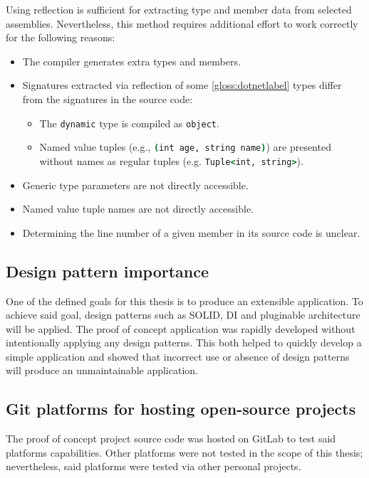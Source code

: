 Using reflection is sufficient for extracting type and member data from selected assemblies. Nevertheless, this method requires additional effort to work correctly for the following reasons:
\begin{itemize}
    \item The compiler generates extra types and members.
    \item Signatures extracted via reflection of some \ref{gloss:dotnetlabel} types differ from the signatures in the source code:
    \begin{itemize}
        \item The \lstinline[language=csh]{dynamic} type is compiled as \lstinline[language=csh]{object}.
        \item Named value tuples (e.g., \lstinline[language=csh]{(int age, string name)}) are presented without names as regular tuples (e.g. \lstinline[language=csh]{Tuple<int, string>}).
    \end{itemize}
    \item Generic type parameters are not directly accessible.
    \item Named value tuple names are not directly accessible.
    \item Determining the line number of a given member in its source code is unclear.
\end{itemize}

\subsection{Design pattern importance}

One of the defined goals for this thesis is to produce an extensible application. To achieve said goal, design patterns such as SOLID, DI and pluginable architecture will be applied.
The proof of concept application was rapidly developed without intentionally applying any design patterns. This both helped to quickly develop a simple application and showed that incorrect use or absence of design patterns will produce an unmaintainable application.

\subsection{Git platforms for hosting open-source projects}

The proof of concept project source code was hosted on GitLab to test said platforms capabilities. Other platforms were not tested in the scope of this thesis; nevertheless, said platforms were tested via other personal projects.

